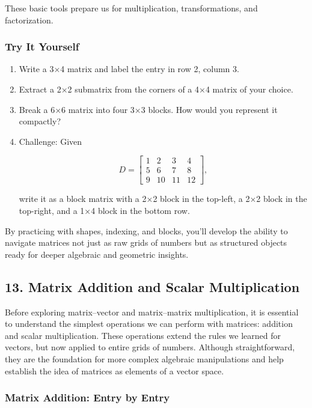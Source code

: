 \documentclass[
  letterpaper,
  DIV=11,
  numbers=noendperiod]{scrreprt}
\begin{document}
These basic tools prepare us for multiplication, transformations, and
factorization.

\subsubsection{Try It Yourself}\label{try-it-yourself-11}

\begin{enumerate}
\def\labelenumi{\arabic{enumi}.}
\item
  Write a 3×4 matrix and label the entry in row 2, column 3.
\item
  Extract a 2×2 submatrix from the corners of a 4×4 matrix of your
  choice.
\item
  Break a 6×6 matrix into four 3×3 blocks. How would you represent it
  compactly?
\item
  Challenge: Given

  \[
  D = \begin{bmatrix} 
  1 & 2 & 3 & 4 \\ 
  5 & 6 & 7 & 8 \\ 
  9 & 10 & 11 & 12 
  \end{bmatrix},
  \]

  write it as a block matrix with a 2×2 block in the top-left, a 2×2
  block in the top-right, and a 1×4 block in the bottom row.
\end{enumerate}

By practicing with shapes, indexing, and blocks, you'll develop the
ability to navigate matrices not just as raw grids of numbers but as
structured objects ready for deeper algebraic and geometric insights.

\subsection{13. Matrix Addition and Scalar
Multiplication}\label{matrix-addition-and-scalar-multiplication}

Before exploring matrix--vector and matrix--matrix multiplication, it is
essential to understand the simplest operations we can perform with
matrices: addition and scalar multiplication. These operations extend
the rules we learned for vectors, but now applied to entire grids of
numbers. Although straightforward, they are the foundation for more
complex algebraic manipulations and help establish the idea of matrices
as elements of a vector space.

\subsubsection{Matrix Addition: Entry by
Entry}\label{matrix-addition-entry-by-entry}
\end{document}
